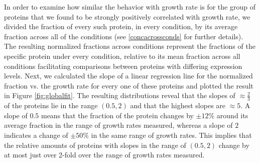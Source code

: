 In order to examine how similar the behavior with growth rate is for the group of proteins that we found to be strongly positively correlated with growth rate, we divided the fraction of every such protein, in every condition, by its average fraction across all of the conditions (see \ref{concacrossconds} for further details).
The resulting normalized fractions across conditions represent the fractions of the specific protein under every condition, relative to its mean fraction across all conditions facilitating comparisons between proteins with differing expression levels.
Next, we calculated the slope of a linear regression line for the normalized fraction vs. the growth rate for every one of these proteins and plotted the result in Figure \ref{fig:globalfit}.
The resulting distributions reveal that the slopes of $\approx \frac{2}{3}$ of the proteins lie in the range $(0.5,2)$ and that the highest slopes are $\approx 5$.
A slope of $0.5$ means that the fraction of the protein changes by $\pm12\%$ around its average fraction in the range of growth rates measured, whereas a slope of $2$ indicates a change of $\pm50\%$ in the same range of growth rates.
This implies that the relative amounts of proteins with slopes in the range of $(0.5,2)$ change by at most just over 2-fold over the range of growth rates measured.